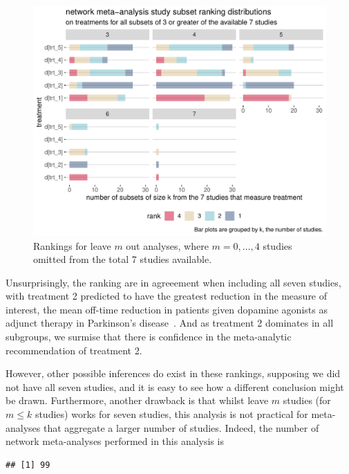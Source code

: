\documentclass[12pt]{article}\usepackage[]{graphicx}\usepackage[]{color}
\makeatletter
\def\maxwidth{ %
  \ifdim\Gin@nat@width>\linewidth
    \linewidth
  \else
    \Gin@nat@width
  \fi
}
\newenvironment{kframe}{%
 \def\at@end@of@kframe{}%
 \ifinner\ifhmode%
  \def\at@end@of@kframe{\end{minipage}}%
  \begin{minipage}{\columnwidth}%
 \fi\fi%
 \def\FrameCommand##1{\hskip\@totalleftmargin \hskip-\fboxsep
 \colorbox{shadecolor}{##1}\hskip-\fboxsep
     \hskip-\linewidth \hskip-\@totalleftmargin \hskip\columnwidth}%
 \MakeFramed {\advance\hsize-\width
   \@totalleftmargin\z@ \linewidth\hsize
   \@setminipage}}%
 {\par\unskip\endMakeFramed%
 \at@end@of@kframe}
\newenvironment{knitrout}{}{} %
\makeatother
\begin{document}
\begin{figure}
\centering
\begin{knitrout}
\color{fgcolor}
\includegraphics[width=\maxwidth]{figure/leavem-1} 

\end{knitrout}

\caption{Rankings for leave $m$ out analyses, where $m = 0, \dots, 4$ studies omitted from the total 7 studies available.}
\label{fig:leavem}
\end{figure}

Unsurprisingly, the ranking are in agreeement when including all seven studies, with treatment 2 predicted to have the greatest reduction in the measure of interest, the mean off-time reduction in patients given dopamine agonists as adjunct therapy in Parkinson's disease~\cite{phillippo_multinma_2020}. And as treatment 2 dominates in all subgroups, we surmise that there is confidence in the meta-analytic recommendation of treatment 2.

However, other possible inferences do exist in these rankings, supposing we did not have all seven studies, and it is easy to see how a different conclusion might be drawn. Furthermore, another drawback is that whilst leave $m$ studies (for $m \leqslant k$ studies) works for seven studies, this analysis is not practical for meta-analyses that aggregate a larger number of studies. Indeed, the number of network meta-analyses performed in this analysis is

\begin{knitrout}
\color{fgcolor}\begin{kframe}
\begin{verbatim}
## [1] 99
\end{verbatim}
\end{kframe}
\end{knitrout}
\end{document}
